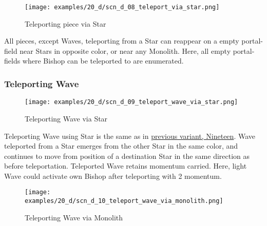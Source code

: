\clearpage %

\noindent
\begin{figure}[!h]
\texttt{[image: examples/20\_d/scn\_d\_08\_teleport\_via\_star.png]}
\caption{Teleporting piece via Star}
\label{fig:scn_d_08_teleport_via_star}
\end{figure}

All pieces, except Waves, teleporting from a Star can reappear on a empty portal-field
near Stars in opposite color, or near any Monolith.
Here, all empty portal-fields where Bishop can be teleported to are enumerated.

\clearpage %

\subsubsection*{Teleporting Wave}

\vspace*{-1.2\baselineskip}
\noindent
\begin{figure}[!h]
\texttt{[image: examples/20\_d/scn\_d\_09\_teleport\_wave\_via\_star.png]}
\caption{Teleporting Wave via Star}
\label{fig:scn_d_09_teleport_wave_via_star}
\end{figure}

Teleporting Wave using Star is the same as in \hyperref[fig:scn_n_04_teleport_move_3]{previous variant, Nineteen}.
Wave teleported from a Star emerges from the other Star in the same color,
and continues to move from position of a destination Star in the same
direction as before teleportation. Teleported Wave retains momentum carried.
Here, light Wave could activate own Bishop after teleporting with 2 momentum.

\clearpage %

\vspace*{-3.2\baselineskip}
\noindent
\begin{figure}[!h]
\texttt{[image: examples/20\_d/scn\_d\_10\_teleport\_wave\_via\_monolith.png]}
\caption{Teleporting Wave via Monolith}
\label{fig:scn_d_10_teleport_wave_via_monolith}
\end{figure}

